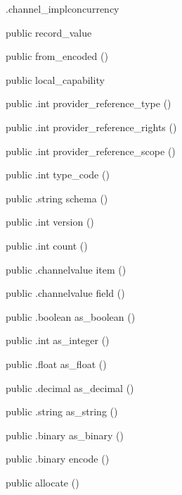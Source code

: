 \begin{CrexxClass}{.channel\_impl}{concurrency}
\begin{Members}
    \Factory
      {public}
      {record\_value}
      {}

    \Factory
      {public}
      {from\_encoded}
      {()}

    \Factory
      {public}
      {local\_capability}
      {}

    \Method
      {public}
      {.int}
      {provider\_reference\_type}
      {()}

    \Method
      {public}
      {.int}
      {provider\_reference\_rights}
      {()}

    \Method
      {public}
      {.int}
      {provider\_reference\_scope}
      {()}

    \Method
      {public}
      {.int}
      {type\_code}
      {()}

    \Method
      {public}
      {.string}
      {schema}
      {()}

    \Method
      {public}
      {.int}
      {version}
      {()}

    \Method
      {public}
      {.int}
      {count}
      {()}

    \Method
      {public}
      {.channelvalue}
      {item}
      {()}

    \Method
      {public}
      {.channelvalue}
      {field}
      {()}

    \Method
      {public}
      {.boolean}
      {as\_boolean}
      {()}

    \Method
      {public}
      {.int}
      {as\_integer}
      {()}

    \Method
      {public}
      {.float}
      {as\_float}
      {()}

    \Method
      {public}
      {.decimal}
      {as\_decimal}
      {()}

    \Method
      {public}
      {.string}
      {as\_string}
      {()}

    \Method
      {public}
      {.binary}
      {as\_binary}
      {()}

    \Method
      {public}
      {.binary}
      {encode}
      {()}

    \Factory
      {public}
      {allocate}
      {()}


\end{Members}
\end{CrexxClass}
